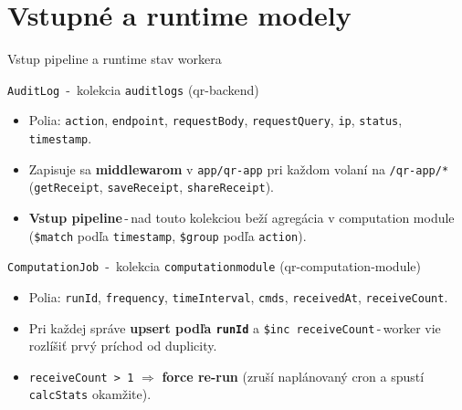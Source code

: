 \documentclass[aspectratio=169,11pt]{beamer}
\begin{document}
\section{Vstupné a runtime modely}
\begin{frame}{Vstup pipeline a runtime stav workera}
  \small
  \begin{block}{\texttt{AuditLog} \,-\, kolekcia \texttt{auditlogs} (qr-backend)}
    \begin{itemize}\small
      \item Polia: \texttt{action}, \texttt{endpoint}, \texttt{requestBody}, \texttt{requestQuery}, \texttt{ip}, \texttt{status}, \texttt{timestamp}.
      \item Zapisuje sa \textbf{middlewarom} v \texttt{app/qr-app} pri každom volaní na \texttt{/qr-app/*} (\texttt{getReceipt}, \texttt{saveReceipt}, \texttt{shareReceipt}).
      \item \textbf{Vstup pipeline}\,-\,nad touto kolekciou beží agregácia v computation module (\texttt{\$match} podľa \texttt{timestamp}, \texttt{\$group} podľa \texttt{action}).
    \end{itemize}
  \end{block}

  \begin{block}{\texttt{ComputationJob} \,-\, kolekcia \texttt{computationmodule} (qr-computation-module)}
    \begin{itemize}\small
      \item Polia: \texttt{runId}, \texttt{frequency}, \texttt{timeInterval}, \texttt{cmds}, \texttt{receivedAt}, \texttt{receiveCount}.
      \item Pri každej správe \textbf{upsert podľa \texttt{runId}} a \texttt{\$inc receiveCount}\,-\,worker vie rozlíšiť prvý príchod od duplicity.
      \item \texttt{receiveCount > 1} $\Rightarrow$ \textbf{force re-run} (zruší naplánovaný cron a spustí \texttt{calcStats} okamžite).
    \end{itemize}
  \end{block}
\end{frame}

\end{document}
